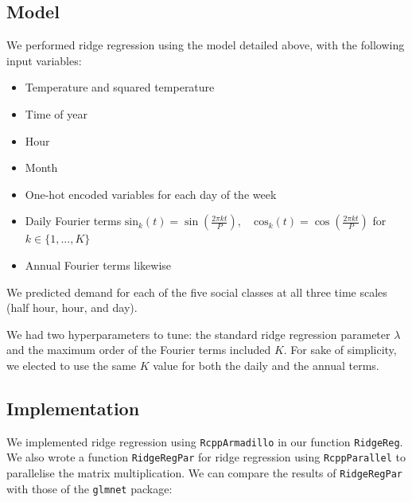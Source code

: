 \documentclass[
]{article}
\providecommand{\tightlist}{%
  \setlength{\itemsep}{0pt}\setlength{\parskip}{0pt}}
\begin{document}
\hypertarget{model}{%
\subsection{Model}\label{model}}

We performed ridge regression using the model detailed above, with the
following input variables:

\begin{itemize}
\tightlist
\item
  Temperature and squared temperature
\item
  Time of year
\item
  Hour
\item
  Month
\item
  One-hot encoded variables for each day of the week
\item
  Daily Fourier terms
  \(\text{sin}_k(t) = \sin\left(\frac{2\pi kt}{P}\right), \quad \text{cos}_k(t) = \cos\left(\frac{2\pi kt}{P}\right)\)
  for \(k \in \{1,...,K\}\)
\item
  Annual Fourier terms likewise
\end{itemize}

We predicted demand for each of the five social classes at all three
time scales (half hour, hour, and day).

We had two hyperparameters to tune: the standard ridge regression
parameter \(\lambda\) and the maximum order of the Fourier terms
included \(K\). For sake of simplicity, we elected to use the same \(K\)
value for both the daily and the annual terms.

\hypertarget{implementation}{%
\subsection{Implementation}\label{implementation}}

We implemented ridge regression using \texttt{RcppArmadillo} in our
function \texttt{RidgeReg}. We also wrote a function
\texttt{RidgeRegPar} for ridge regression using \texttt{RcppParallel} to
parallelise the matrix multiplication. We can compare the results of
\texttt{RidgeRegPar} with those of the \texttt{glmnet} package:
\end{document}
